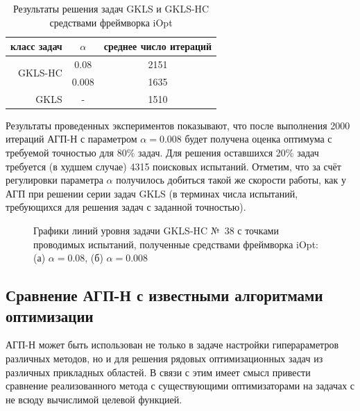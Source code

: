 \documentclass[a4paper,12pt,russian]{article}
\begin{document}
\begin{table}[h!]
\centering
\caption{Результаты решения задач GKLS и GKLS-HC средствами фреймворка iOpt}
\begin{tabular}{||r|c|c||}
\hline
 класс задач & $\alpha$ & среднее число итераций \\ \hline
\multirow{2}{*}{GKLS-HC} & 0.08 & 2151 \\ \cline{2-3} 
 & 0.008 & 1635 \\ \hline
GKLS & - & 1510 \\ \hline
\end{tabular}
\label{iOpt_gkls}
\end{table}

Результаты проведенных экспериментов показывают, что после выполнения 2000 итераций АГП-Н с параметром $\alpha = 0.008$ будет получена оценка оптимума с требуемой точностью для 80\% задач. Для решения оставшихся 20\% задач требуется (в худшем случае) 4315 поисковых испытаний. Отметим, что за счёт регулировки параметра $\alpha$ получилось добиться такой же скорости работы, как у  АГП при решении серии задач GKLS (в терминах числа испытаний, требующихся для решения задач с заданной точностью).

\begin{figure}[h!]
	\caption{Графики линий уровня задачи GKLS-HC №~38 с точками проводимых испытаний, полученные средствами фреймворка iOpt: (а) $\alpha = 0.08$, (б) $\alpha = 0.008$ }
	\label{iOpt_result}
\end{figure}

\subsection{Сравнение АГП-Н с известными алгоритмами оптимизации}

АГП-Н может быть использован не только в задаче настройки гиперараметров различных методов, но и для решения рядовых оптимизационных задач из различных прикладных областей. В связи с этим имеет смысл привести сравнение реализованного метода с существующими оптимизаторами на задачах с не всюду вычислимой целевой функцией.
\end{document}
